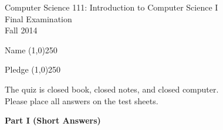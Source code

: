 \documentclass[12pt]{article}
\def\widow#1{\vskip #1\vbadness10000\penalty-200\vskip-#1}
\begin{document}

\def\widow#1{\vskip #1\vbadness10000\penalty-200\vskip-#1}

\begin{center}

Computer Science 111: Introduction to Computer Science I \\
Final Examination \\
Fall 2014 \\

\vspace{.25in}

Name \line(1,0){250}

Pledge \line(1,0){250}

\end{center}

\noindent


\medskip \noindent \begin{center} The quiz is closed book, closed notes, and closed computer. \\ Please place all
answers on the test sheets.  \end{center}

\newpage

\noindent
{\bf Part I (Short Answers)}
\end{document}
